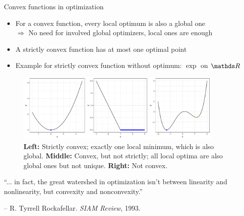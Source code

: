 \documentclass[11pt,compress,t,notes=noshow, xcolor=table]{beamer}
\begin{document}
\begin{vbframe}{Convex functions in optimization}
  
\begin{itemize}
    \item For a convex function, every local optimum is also a global one \\
        $\Rightarrow$ No need for involved global optimizers, local ones are enough
    \item A strictly convex function has at most one optimal point
     \item Example for strictly convex function without optimum: $\exp$ on $\R$
\end{itemize}

\begin{figure}
    \centering
    \includegraphics[width=0.9\textwidth]{figure_man/convexity_3.pdf}
    \caption*{\footnotesize
        \textbf{Left:} Strictly convex; exactly one local minimum, which is also global.
        \textbf{Middle:} Convex, but not strictly; all local optima are also global ones but not unique.
        \textbf{Right:} Not convex.}
\end{figure}
  
\framebreak

\begin{kframe}
    {\large \enquote{... in fact, the great watershed in optimization isn't between linearity and nonlinearity, but convexity and nonconvexity.}}

    \medskip
    
    -- R. Tyrrell Rockafellar. \textit{SIAM Review}, 1993.
\end{kframe}

\vspace{-0.5\baselineskip}

\begin{figure}
    \centering
\end{figure}

\end{vbframe}

\endlecture
\end{document}
